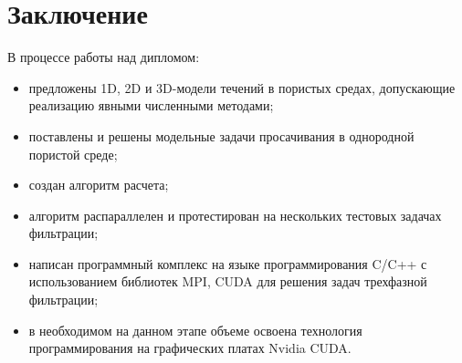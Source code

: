 \section{Заключение}

В процессе работы над дипломом:

\begin{itemize}
	\item 	предложены 1D, 2D и 3D-модели течений в пористых средах,
	допускающие реализацию явными численными методами;

	\item поставлены и решены модельные задачи просачивания в однородной 
	пористой среде;

	\item 	создан алгоритм расчета;
	
	\item 	алгоритм распараллелен и протестирован на нескольких тестовых задачах 
	фильтрации;
	
	\item	написан программный комплекс на языке программирования C/C++ с использованием 
	библиотек MPI, CUDA для решения задач трехфазной фильтрации;
	
	\item в необходимом на данном этапе объеме освоена технология 
	программирования на графических платах Nvidia CUDA.

\end{itemize}
